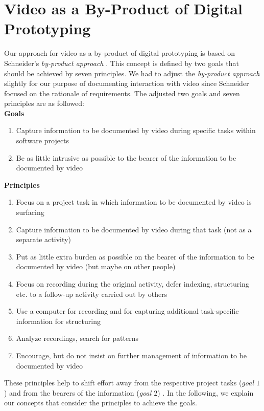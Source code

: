 \documentclass[conference]{IEEEtran}
\begin{document}
\section{Video as a By-Product of Digital Prototyping}
\label{ch:approach}
Our approach for video as a by-product of digital prototyping is based on 
Schneider's \textit{by-product approach} \cite{Schneider.2006}. This concept is 
defined by two goals that should be achieved by seven principles. We had to 
adjust the \textit{by-product approach} slightly for our purpose of documenting 
interaction with video since Schneider \cite{Schneider.2006} focused on 
the rationale of requirements. The adjusted two goals and seven principles are 
as followed:\\
\textbf{Goals}
\begin{enumerate}
	\item Capture information to be documented by video during 
	specific tasks within software projects
	\item Be as little intrusive as possible to the bearer of the information 
	to be documented by video
\end{enumerate}
\textbf{Principles}
\begin{enumerate}
	\item Focus on a project task in which information to be documented by 
	video is surfacing
	\item Capture information to be documented by video during that task (not 
	as a separate activity)
	\item Put as little extra burden as possible on the bearer of the 
	information to be documented by video (but maybe on other people)
	\item Focus on recording during the original activity, defer indexing, 
	structuring etc. to a follow-up activity carried out by others
	\item Use a computer for recording and for capturing additional 
	task-specific information for structuring
	\item Analyze recordings, search for patterns
	\item Encourage, but do not insist on further management of information to 
	be documented by video
\end{enumerate}

These principles help to shift effort away from the respective project tasks 
(\textit{goal $1$}) and from the bearers of the information (\textit{goal $2$}) 
\cite{Schneider.2006}. In the following, we explain our concepts that consider 
the principles to achieve the goals.
\end{document}
